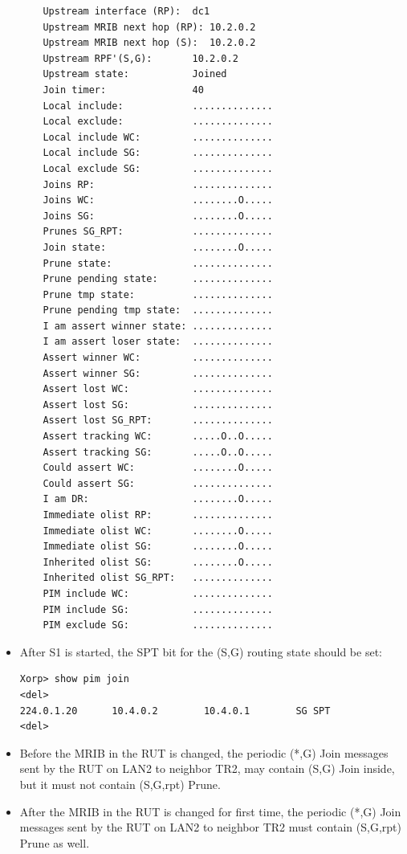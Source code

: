 \documentclass[11pt]{report}
\begin{document}
\begin{itemize}
\begin{verbatim}
    Upstream interface (RP):  dc1
    Upstream MRIB next hop (RP): 10.2.0.2
    Upstream MRIB next hop (S):  10.2.0.2
    Upstream RPF'(S,G):       10.2.0.2
    Upstream state:           Joined 
    Join timer:               40
    Local include:            ..............
    Local exclude:            ..............
    Local include WC:         ..............
    Local include SG:         ..............
    Local exclude SG:         ..............
    Joins RP:                 ..............
    Joins WC:                 ........O.....
    Joins SG:                 ........O.....
    Prunes SG_RPT:            ..............
    Join state:               ........O.....
    Prune state:              ..............
    Prune pending state:      ..............
    Prune tmp state:          ..............
    Prune pending tmp state:  ..............
    I am assert winner state: ..............
    I am assert loser state:  ..............
    Assert winner WC:         ..............
    Assert winner SG:         ..............
    Assert lost WC:           ..............
    Assert lost SG:           ..............
    Assert lost SG_RPT:       ..............
    Assert tracking WC:       .....O..O.....
    Assert tracking SG:       .....O..O.....
    Could assert WC:          ........O.....
    Could assert SG:          ..............
    I am DR:                  ........O.....
    Immediate olist RP:       ..............
    Immediate olist WC:       ........O.....
    Immediate olist SG:       ........O.....
    Inherited olist SG:       ........O.....
    Inherited olist SG_RPT:   ..............
    PIM include WC:           ..............
    PIM include SG:           ..............
    PIM exclude SG:           ..............
\end{verbatim}

  \item After S1 is started, the SPT bit for the (S,G) routing state should be
  set:

\begin{verbatim}
Xorp> show pim join 
<del>
224.0.1.20      10.4.0.2        10.4.0.1        SG SPT 
<del>
\end{verbatim}

  \item Before the MRIB in the RUT is changed, the periodic (*,G) Join
  messages sent by the RUT on LAN2 to neighbor TR2, may contain (S,G) Join
  inside, but it must not contain (S,G,rpt) Prune.

  \item After the MRIB in the RUT is changed for first time, the periodic
  (*,G) Join messages sent by the RUT on LAN2 to neighbor TR2 must contain
  (S,G,rpt) Prune as well.


\end{itemize}
\end{document}
